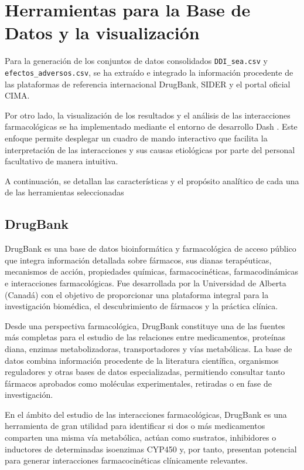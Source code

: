 

\section{Herramientas para la Base de Datos y la visualización}
Para la generación de los conjuntos de datos consolidados \texttt{DDI\_sea.csv} y \texttt{efectos\_adversos.csv}, se ha extraído e integrado la información procedente de las plataformas de referencia internacional DrugBank, SIDER y el portal oficial CIMA. 

Por otro lado, la visualización de los resultados y el análisis de las interacciones farmacológicas se ha implementado mediante el entorno de desarrollo Dash \cite{dash_framework}. Este enfoque permite desplegar un cuadro de mando interactivo que facilita la interpretación de las interacciones y sus causas etiológicas por parte del personal facultativo de manera intuitiva.

A continuación, se detallan las características y el propósito analítico de cada una de las herramientas seleccionadas

\subsection*{DrugBank}
DrugBank \cite{drugbank} es una base de datos bioinformática y farmacológica de acceso público que integra información detallada sobre fármacos, sus dianas terapéuticas, mecanismos de acción, propiedades químicas, farmacocinéticas, farmacodinámicas e interacciones farmacológicas. Fue desarrollada por la Universidad de Alberta (Canadá) con el objetivo de proporcionar una plataforma integral para la investigación biomédica, el descubrimiento de fármacos y la práctica clínica.

Desde una perspectiva farmacológica, DrugBank constituye una de las fuentes más completas para el estudio de las relaciones entre medicamentos, proteínas diana, enzimas metabolizadoras, transportadores y vías metabólicas. La base de datos combina información procedente de la literatura científica, organismos reguladores y otras bases de datos especializadas, permitiendo consultar tanto fármacos aprobados como moléculas experimentales, retiradas o en fase de investigación.

En el ámbito del estudio de las interacciones farmacológicas, DrugBank es una herramienta de gran utilidad para identificar si dos o más medicamentos comparten una misma vía metabólica, actúan como sustratos, inhibidores o inductores de determinadas isoenzimas CYP450 y, por tanto, presentan potencial para generar interacciones farmacocinéticas clínicamente relevantes.

